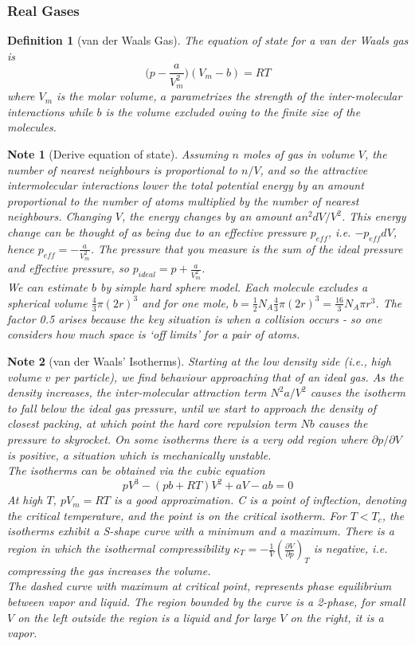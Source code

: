 \documentclass[a4paper]{article}
\newtheorem{defi}{Definition}[section]
\theoremstyle{new}
\newtheorem{Note}{Note}[section]
\begin{document}
\subsubsection*{Real Gases}
\begin{defi}[van der Waals Gas]
The equation of state for a van der Waals gas is
$$\bigg(p-\frac{a}{V_m^2}\bigg)(V_m-b)=RT$$
where $V_m$ is the molar volume, $a$ parametrizes the strength of the inter-molecular interactions while $b$ is the volume excluded owing to the finite size of the molecules.
\end{defi}
\begin{Note}[Derive equation of state]
Assuming $n$ moles of gas in volume $V$, the number of nearest neighbours is proportional to $n/V$, and so the attractive intermolecular interactions lower the total potential energy by an amount proportional to the number of atoms multiplied by the number of nearest neighbours. Changing $V$, the energy changes by an amount $an^2dV/V^2$. This energy change can be thought of as being due to an effective pressure $p_{eff}$, i.e. $-p_{eff}dV$, hence $p_{eff}=-\frac{a}{V_m^2}$. The pressure that you measure is the sum of the ideal pressure and effective pressure, so $p_{ideal}=p+\frac{a}{V_m^2}$.\\[5pt]
We can estimate $b$ by simple hard sphere model. Each molecule excludes a spherical volume $\frac{4}{3}\pi(2r)^3$ and for one mole, $b=\frac{1}{2}N_A\frac{4}{3}\pi(2r)^3=\frac{16}{3}N_A\pi r^3$. The factor 0.5 arises because the key situation is when a collision occurs - so one considers how much space is `off limits' for a pair of atoms.
\end{Note}
\begin{Note}[van der Waals' Isotherms]
Starting at the low density side (i.e., high volume $v$ per particle), we find behaviour approaching that of an ideal gas. As the density increases, the inter-molecular attraction term $N^2a/V^2$ causes the isotherm to fall below the ideal gas pressure, until we start to approach the density of closest packing, at which point the hard core repulsion term $N b$ causes the pressure to skyrocket. On some isotherms there is a very odd region where $\partial p/\partial V$ is positive, a situation which is mechanically unstable.\\[5pt]
The isotherms can be obtained via the cubic equation
$$pV^3-(pb+RT)V^2+aV-ab=0$$
At high $T$, $pV_m=RT$ is a good approximation. C is a point of inflection, denoting the critical temperature, and the point is on the critical isotherm. For $T<T_c$, the isotherms exhibit a S-shape curve with a minimum and a maximum. There is a region in which the isothermal compressibility $\kappa_T=-\frac{1}{V}(\frac{\partial V}{\partial p})_T$ is negative, i.e. compressing the gas increases the volume.\\[5pt]
The dashed curve with maximum at critical point, represents phase equilibrium between vapor and liquid. The region bounded by the curve is a 2-phase, for small $V$ on the left outside the region is a liquid and for large $V$ on the right, it is a vapor.
\end{Note}
\end{document}
